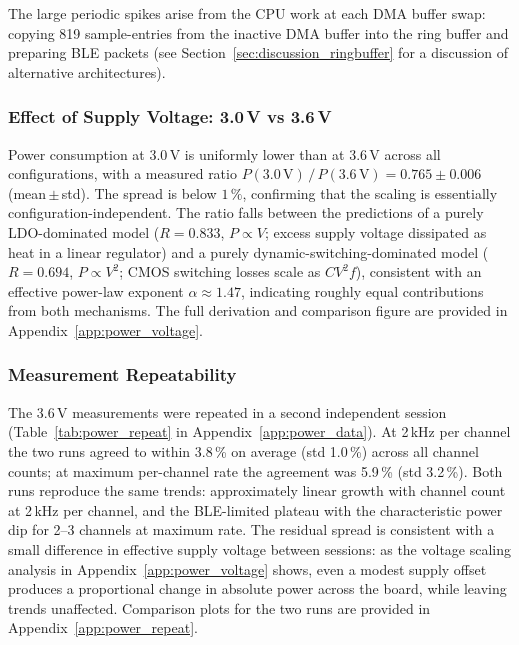 The large periodic spikes arise from the CPU work at each DMA buffer swap: copying
819 sample-entries from the inactive DMA buffer into the ring buffer and preparing
BLE packets (see Section~\ref{sec:discussion_ringbuffer} for a discussion of
alternative architectures).

\subsubsection*{Effect of Supply Voltage: 3.0\,V vs 3.6\,V}

Power consumption at 3.0\,V is uniformly lower than at 3.6\,V across all
configurations, with a measured ratio $P(3.0\,\text{V})\,/\,P(3.6\,\text{V})
= 0.765 \pm 0.006$ (mean\,$\pm$\,std). The spread is below $1\,\%$,
confirming that the scaling is essentially configuration-independent.
The ratio falls between the predictions of a purely LDO-dominated model
($R = 0.833$, $P \propto V$; excess supply voltage dissipated as heat in a
linear regulator) and a purely dynamic-switching-dominated model
($R = 0.694$, $P \propto V^2$; CMOS switching losses scale as $CV^2\!f$),
consistent with an effective power-law exponent $\alpha \approx 1.47$,
indicating roughly equal contributions from both mechanisms. The full
derivation and comparison figure are provided in
Appendix~\ref{app:power_voltage}.

\subsubsection*{Measurement Repeatability}

The 3.6\,V measurements were repeated in a second independent session
(Table~\ref{tab:power_repeat} in Appendix~\ref{app:power_data}).
At 2\,kHz per channel the two runs agreed to within 3.8\,\% on average
(std 1.0\,\%) across all channel counts; at maximum per-channel rate
the agreement was 5.9\,\% (std 3.2\,\%). Both runs reproduce the same trends:
approximately linear growth with channel count at 2\,kHz per channel, and the
BLE-limited plateau with the characteristic power dip for 2--3 channels at
maximum rate. The residual spread is consistent with a small difference in
effective supply voltage between sessions: as the voltage scaling analysis in
Appendix~\ref{app:power_voltage} shows, even a modest supply offset produces a
proportional change in absolute power across the board, while leaving trends
unaffected. Comparison
plots for the two runs are provided in Appendix~\ref{app:power_repeat}.

